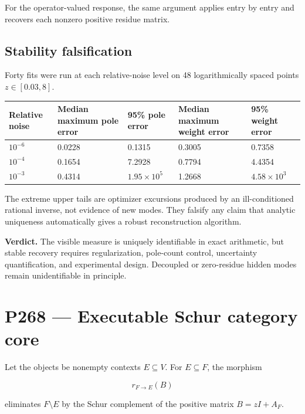 \documentclass[11pt,a4paper,openany]{report}
\begin{document}
For the operator-valued response, the same argument applies entry by entry and recovers each nonzero positive residue matrix.

\section{Stability falsification}

Forty fits were run at each relative-noise level on 48 logarithmically spaced points \(z\in[0.03,8]\).

\begin{center}
\begingroup\fontsize{7}{8.4}\selectfont
\setlength{\tabcolsep}{2.5pt}
\renewcommand{\arraystretch}{1.16}
\begin{longtable}{@{}p{}p{}p{}p{}p{}@{}}
\toprule
\textbf{Relative noise} & \textbf{Median maximum pole error} & \textbf{95\% pole error} & \textbf{Median maximum weight error} & \textbf{95\% weight error} \\
\midrule
\endhead
\(10^{-6}\) & 0.0228 & 0.1315 & 0.3005 & 0.7358 \\
\(10^{-4}\) & 0.1654 & 7.2928 & 0.7794 & 4.4354 \\
\(10^{-3}\) & 0.4314 & \(1.95\times10^5\) & 1.2668 & \(4.58\times10^3\) \\
\bottomrule
\end{longtable}
\endgroup
\end{center}

The extreme upper tails are optimizer excursions produced by an ill-conditioned rational inverse, not evidence of new modes. They falsify any claim that analytic uniqueness automatically gives a robust reconstruction algorithm.

\textbf{Verdict.} The visible measure is uniquely identifiable in exact arithmetic, but stable recovery requires regularization, pole-count control, uncertainty quantification, and experimental design. Decoupled or zero-residue hidden modes remain unidentifiable in principle.

\chapter{P268 --- Executable Schur category core}

Let the objects be nonempty contexts \(E\subseteq V\). For \(E\subseteq F\), the morphism

\[
r_{F\to E}(B)
\]

eliminates \(F\setminus E\) by the Schur complement of the positive matrix \(B=zI+A_F\).
\end{document}
